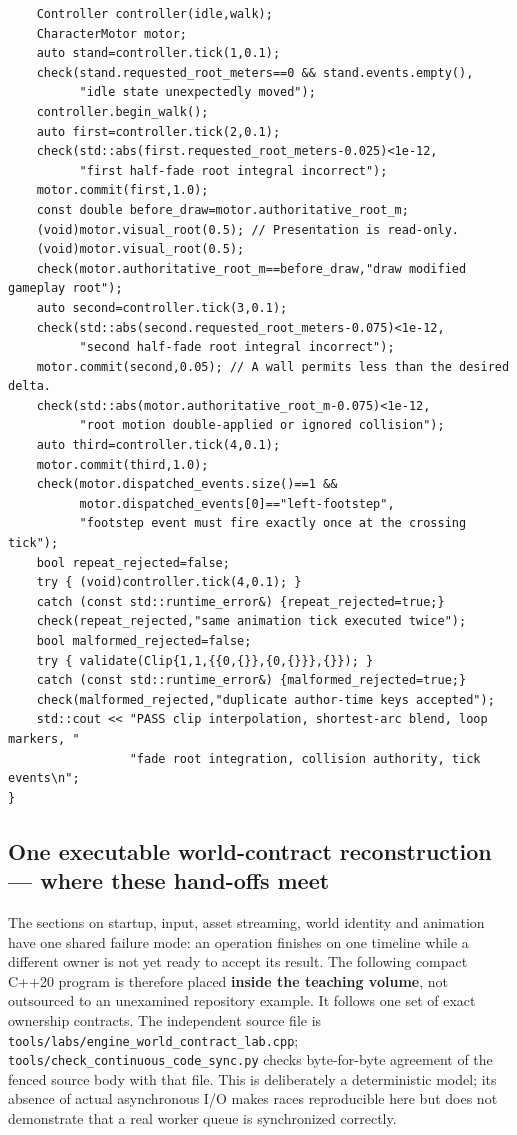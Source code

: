 \begin{verbatim}
    Controller controller(idle,walk);
    CharacterMotor motor;
    auto stand=controller.tick(1,0.1);
    check(stand.requested_root_meters==0 && stand.events.empty(),
          "idle state unexpectedly moved");
    controller.begin_walk();
    auto first=controller.tick(2,0.1);
    check(std::abs(first.requested_root_meters-0.025)<1e-12,
          "first half-fade root integral incorrect");
    motor.commit(first,1.0);
    const double before_draw=motor.authoritative_root_m;
    (void)motor.visual_root(0.5); // Presentation is read-only.
    (void)motor.visual_root(0.5);
    check(motor.authoritative_root_m==before_draw,"draw modified gameplay root");
    auto second=controller.tick(3,0.1);
    check(std::abs(second.requested_root_meters-0.075)<1e-12,
          "second half-fade root integral incorrect");
    motor.commit(second,0.05); // A wall permits less than the desired delta.
    check(std::abs(motor.authoritative_root_m-0.075)<1e-12,
          "root motion double-applied or ignored collision");
    auto third=controller.tick(4,0.1);
    motor.commit(third,1.0);
    check(motor.dispatched_events.size()==1 &&
          motor.dispatched_events[0]=="left-footstep",
          "footstep event must fire exactly once at the crossing tick");
    bool repeat_rejected=false;
    try { (void)controller.tick(4,0.1); }
    catch (const std::runtime_error&) {repeat_rejected=true;}
    check(repeat_rejected,"same animation tick executed twice");
    bool malformed_rejected=false;
    try { validate(Clip{1,1,{{0,{}},{0,{}}},{}}); }
    catch (const std::runtime_error&) {malformed_rejected=true;}
    check(malformed_rejected,"duplicate author-time keys accepted");
    std::cout << "PASS clip interpolation, shortest-arc blend, loop markers, "
                 "fade root integration, collision authority, tick events\n";
}
\end{verbatim}

\subsection{One executable world-contract reconstruction --- where these hand-offs meet}\label{06-engine-ii-ch040-one-executable-world-contract-reconstruction-where-these-hand-offs-meet}

\hypertarget{06-engine-ii-ch040-one-executable-world-contract-reconstruction-where-these-hand-offs-meet}{}

The sections on startup, input, asset streaming, world identity and animation have one shared failure mode: an operation finishes on one timeline while a different owner is not yet ready to accept its result. The following compact C++20 program is therefore placed \textbf{inside the teaching volume}, not outsourced to an unexamined repository example. It follows one set of exact ownership contracts. The independent source file is \texttt{tools/labs/engine\_world\_contract\_lab.cpp}; \texttt{tools/check\_continuous\_code\_sync.py} checks byte-for-byte agreement of the fenced source body with that file. This is deliberately a deterministic model; its absence of actual asynchronous I/O makes races reproducible here but does not demonstrate that a real worker queue is synchronized correctly.


